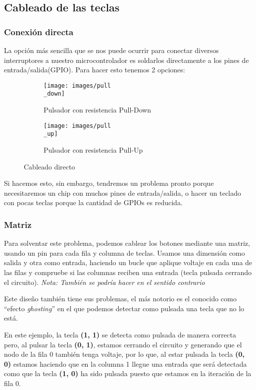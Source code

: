 \subsection{Cableado de las teclas}
    \subsubsection{Conexión directa}
    La opción más sencilla que se nos puede ocurrir para conectar diversos interruptores a nuestro microcontrolador es soldarlos directamente a los pines de entrada/salida(GPIO). Para hacer esto tenemos 2 opciones:
    \begin{figure}[H]
        \begin{subfigure}[b]{.5\textwidth}
          \centering
          \texttt{[image: images/pull\\\_down]}
          \caption{Pulsador con resistencia Pull-Down}
        \end{subfigure} 
        \hfill
        \begin{subfigure}[b]{.5\textwidth}
          \centering
          \texttt{[image: images/pull\\\_up]}
          \caption{Pulsador con resistencia Pull-Up}
        \end{subfigure}
        \caption{Cableado directo}
      \end{figure}
    
    Si hacemos esto, sin embargo, tendremos un problema pronto porque necesitaremos un chip con muchos pines de entrada/salida, o hacer un teclado con pocas teclas porque la cantidad de GPIOs es reducida.

    \subsubsection{Matriz}
    Para solventar este problema, podemos cablear los botones mediante una matriz, usando un pin para cada fila y columna de teclas. Usamos una dimensión como salida y otra como entrada, haciendo un bucle que aplique voltaje en cada una de las filas y compruebe si las columnas reciben una entrada (tecla pulsada cerrando el circuito). \emph{Nota: También se podría hacer en el sentido contrario}

    Este diseño también tiene sus problemas, el más notorio es el conocido como ``efecto \textit{ghosting}'' en el que podemos detectar como pulsada una tecla que no lo está.

    En este ejemplo, la tecla \textbf{(1, 1)} se detecta como pulsada de manera correcta pero, al pulsar la tecla \textbf{(0, 1)}, estamos cerrando el circuito y generando que el nodo de la fila 0 también tenga voltaje, por lo que, al estar pulsada la tecla \textbf{(0, 0)} estamos haciendo que en la columna 1 llegue una entrada que será detectada como que la tecla \textbf{(1, 0)} ha sido pulsada puesto que estamos en la iteración de la fila 0.\vspace{0.2cm}\par

